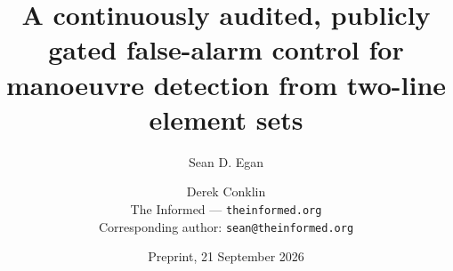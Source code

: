 \documentclass[11pt]{article}
\begin{document}
\title{A continuously audited, publicly gated false-alarm control for manoeuvre detection from two-line element sets}
\author{Sean D. Egan \and Derek Conklin\\
  \normalsize The Informed --- \texttt{theinformed.org}\\
  \normalsize Corresponding author: \texttt{sean@theinformed.org}}
\date{Preprint, 21 September 2026}
\maketitle


\end{document}
